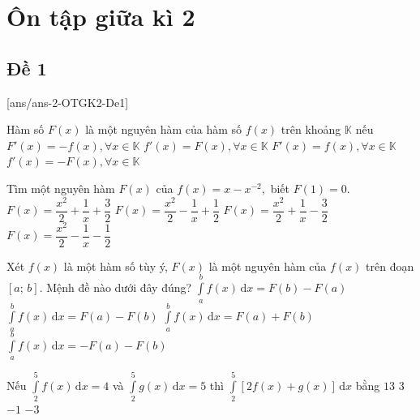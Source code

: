 \section{Ôn tập giữa kì 2}
\subsection{Đề 1}
[ans/ans-2-OTGK2-De1]
\caulc
\begin{ex}%
	Hàm số $F(x)$ là một nguyên hàm của hàm số $f(x)$ trên khoảng $\mathbb{K}$ nếu
	\choice
	{$F'(x)=-f(x),\forall x\in \mathbb{K}$}
	{$f'(x)=F(x),\forall x\in \mathbb{K}$}
	{\True $F'(x)=f(x),\forall x\in \mathbb{K}$}
	{$f'(x)=-F(x),\forall x\in \mathbb{K}$}
\end{ex}
\begin{ex}%
	Tìm một nguyên hàm $F(x)$ của $f(x)=x-x^{-2},$ biết $F(1)=0$.
	\choice
	{$F(x)=\dfrac{x^{2}}{2}+\dfrac{1}{x}+\dfrac{3}{2}$}
	{$F(x)=\dfrac{x^{2}}{2}-\dfrac{1}{x}+\dfrac{1}{2}$}
	{\True $F(x)=\dfrac{x^{2}}{2}+\dfrac{1}{x}-\dfrac{3}{2}$}
	{$F(x)=\dfrac{x^{2}}{2}-\dfrac{1}{x}-\dfrac{1}{2}$}
\end{ex}
\begin{ex}%
	Xét $ f(x)$ là một hàm số tùy ý, $ F(x)$ là một nguyên hàm của $f(x)$ trên đoạn $\left[a;\,b\right]$. Mệnh đề nào dưới đây đúng?
	\choice
	{\True $\displaystyle\int\limits_a^b{f(x)\mathrm{\,d}x}=F(b)-F(a)$}
	{$\displaystyle\int\limits_a^b{f(x)\mathrm{\,d}x}=F(a)-F(b)$}
	{$\displaystyle\int\limits_a^b{f(x)\mathrm{\,d}x}=F(a)+F(b)$}
	{$\displaystyle\int\limits_a^b{f(x)\mathrm{\,d}x}=-F(a)-F(b)$}
\end{ex}
\begin{ex}%
	Nếu $\displaystyle\int\limits_{2}^{5}f(x)\mathrm{\,d}x=4$ và $\displaystyle\int\limits_{2}^{5}g(x)\mathrm{\,d}x=5$ thì $\displaystyle\int\limits_{2}^{5}[2 f(x)+g(x)]\mathrm{\,d}x$ bằng
	\choice
	{\True $13$}
	{$3$}
	{$-1$}
	{$-3$}
\end{ex}
